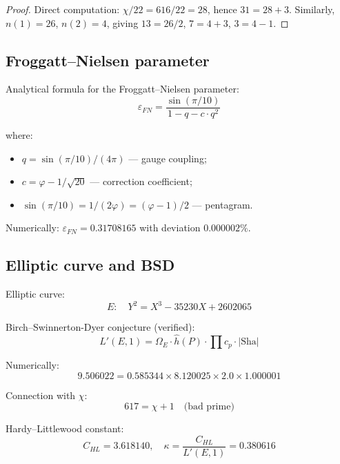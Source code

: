 \documentclass[12pt,a4paper,twoside]{article}
\newcommand{\EPS}{\varepsilon}
\theoremstyle{definition}
\begin{document}
\begin{proof}
Direct computation: $\chi/22 = 616/22 = 28$, hence $31 = 28 + 3$. Similarly, $n(1) = 26$, $n(2) = 4$, giving $13 = 26/2$, $7 = 4 + 3$, $3 = 4 - 1$.
\end{proof}

\subsection{Froggatt--Nielsen parameter}

Analytical formula for the Froggatt--Nielsen parameter:
\begin{equation}
\boxed{
\EPS_{FN} = \frac{\sin(\pi/10)}{1 - q - c \cdot q^2}
}
\label{eq:epsilon}
\end{equation}

where:
\begin{itemize}
    \item $q = \sin(\pi/10)/(4\pi)$ — gauge coupling;
    \item $c = \varphi - 1/\sqrt{20}$ — correction coefficient;
    \item $\sin(\pi/10) = 1/(2\varphi) = (\varphi - 1)/2$ — pentagram.
\end{itemize}

Numerically: $\EPS_{FN} = 0.31708165$ with deviation $0.000002\%$.

\subsection{Elliptic curve and BSD}

Elliptic curve:
\begin{equation}
E: \quad Y^2 = X^3 - 35230X + 2602065
\label{eq:curve}
\end{equation}

Birch--Swinnerton-Dyer conjecture (verified):
\begin{equation}
L'(E, 1) = \Omega_E \cdot \hat{h}(P) \cdot \prod c_p \cdot |\text{Sha}|
\label{eq:bsd}
\end{equation}

Numerically:
\begin{equation}
9.506022 = 0.585344 \times 8.120025 \times 2.0 \times 1.000001
\end{equation}

Connection with $\chi$:
\begin{equation}
617 = \chi + 1 \quad \text{(bad prime)}
\end{equation}

Hardy--Littlewood constant:
\begin{equation}
C_{HL} = 3.618140, \quad \kappa = \frac{C_{HL}}{L'(E,1)} = 0.380616
\end{equation}
\end{document}
